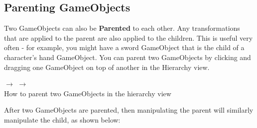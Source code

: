 \documentclass[11pt]{article}
\begin{document}
\subsection{Parenting GameObjects}

Two GameObjects can also be \textbf{Parented} to each other.  Any transformations that are applied to the parent are also applied to the children.  This is useful very often - for example, you might have a sword GameObject that is the child of a character's hand GameObject.  You can parent two GameObjects by clicking and dragging one GameObject on top of another in the Hierarchy view.

\begin{center}
\centering \noindent
{} $\rightarrow$
 $\rightarrow$
 \\
How to parent two GameObjects in the hierarchy view
\end{center}

After two GameObjects are parented, then manipulating the parent will similarly manipulate the child, as shown below:
\end{document}
